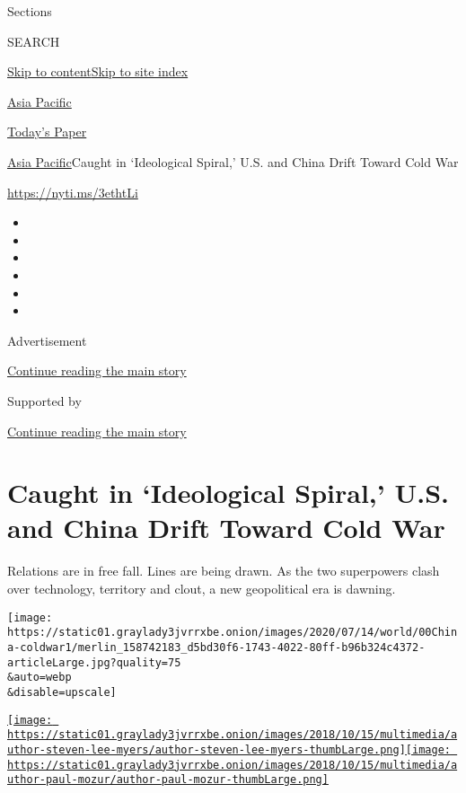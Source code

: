 Sections

SEARCH

\protect\hyperlink{site-content}{Skip to
content}\protect\hyperlink{site-index}{Skip to site index}

\href{https://www.nytimes3xbfgragh.onion/section/world/asia}{Asia
Pacific}

\href{https://myaccount.nytimes3xbfgragh.onion/auth/login?response_type=cookie\&client_id=vi}{}

\href{https://www.nytimes3xbfgragh.onion/section/todayspaper}{Today's
Paper}

\href{/section/world/asia}{Asia Pacific}\textbar{}Caught in `Ideological
Spiral,' U.S. and China Drift Toward Cold War

\url{https://nyti.ms/3ethtLi}

\begin{itemize}
\item
\item
\item
\item
\item
\item
\end{itemize}

Advertisement

\protect\hyperlink{after-top}{Continue reading the main story}

Supported by

\protect\hyperlink{after-sponsor}{Continue reading the main story}

\hypertarget{caught-in-ideological-spiral-us-and-china-drift-toward-cold-war}{%
\section{Caught in `Ideological Spiral,' U.S. and China Drift Toward
Cold
War}\label{caught-in-ideological-spiral-us-and-china-drift-toward-cold-war}}

Relations are in free fall. Lines are being drawn. As the two
superpowers clash over technology, territory and clout, a new
geopolitical era is dawning.

\texttt{[image: https://static01.graylady3jvrrxbe.onion/images/2020/07/14/world/00China-coldwar1/merlin\_158742183\_d5bd30f6-1743-4022-80ff-b96b324c4372-articleLarge.jpg?quality=75\\\&auto=webp\\\&disable=upscale]}

\href{https://www.nytimes3xbfgragh.onion/by/steven-lee-myers}{\texttt{[image: https://static01.graylady3jvrrxbe.onion/images/2018/10/15/multimedia/author-steven-lee-myers/author-steven-lee-myers-thumbLarge.png]}}\href{https://www.nytimes3xbfgragh.onion/by/paul-mozur}{\texttt{[image: https://static01.graylady3jvrrxbe.onion/images/2018/10/15/multimedia/author-paul-mozur/author-paul-mozur-thumbLarge.png]}}

